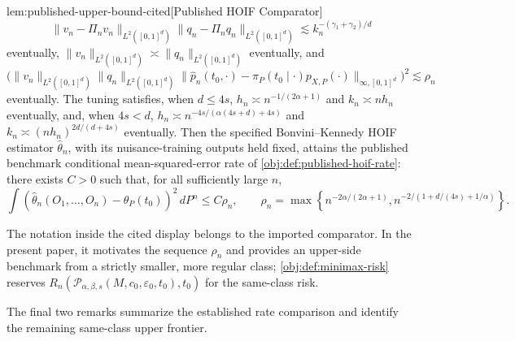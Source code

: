 \begin{citedv}{lem:published-upper-bound-cited}[Published HOIF Comparator]
\[
\|v_n-\Pi_n v_n\|_{L^2([0,1]^d)}
\|q_n-\Pi_n q_n\|_{L^2([0,1]^d)}
\lesssim k_n^{-(\gamma_1+\gamma_2)/d}
\]
eventually, \(\|v_n\|_{L^2([0,1]^d)}\asymp\|q_n\|_{L^2([0,1]^d)}\) eventually, and
\[
\bigl(\|v_n\|_{L^2([0,1]^d)}
\|q_n\|_{L^2([0,1]^d)}
\|\hat p_n(t_0,\cdot)-\pi_P(t_0\mid\cdot)p_{X,P}(\cdot)\|_{\infty,[0,1]^d}\bigr)^2
\lesssim \rho_n
\]
eventually. The tuning satisfies, when \(d\le 4s\), \(h_n\asymp n^{-1/(2\alpha+1)}\) and \(k_n\asymp nh_n\) eventually, and, when \(4s<d\), \(h_n\asymp n^{-4s/(\alpha(4s+d)+4s)}\) and \(k_n\asymp(nh_n)^{2d/(d+4s)}\) eventually. Then the specified Bonvini--Kennedy HOIF estimator \(\hat\theta_n\), with its nuisance-training outputs held fixed, attains the published benchmark conditional mean-squared-error rate of \cref{obj:def:published-hoif-rate}: there exists \(C>0\) such that, for all sufficiently large \(n\),
\[
\int (\hat\theta_n(O_1,\ldots,O_n)-\theta_P(t_0))^2\,dP^n
\le C\rho_n,\qquad
\rho_n=
\max\left\{n^{-2\alpha/(2\alpha+1)},
n^{-2/(1+d/(4s)+1/\alpha)}\right\}.
\]
\end{citedv}

The notation inside the cited display belongs to the imported comparator. In the present paper, it motivates the sequence \(\rho_n\) and provides an upper-side benchmark from a strictly smaller, more regular class; \cref{obj:def:minimax-risk} reserves \(R_n(\mathcal P_{\alpha,\beta,s}(M,c_0,\varepsilon_0,t_0),t_0)\) for the same-class risk.

The final two remarks summarize the established rate comparison and identify the remaining same-class upper frontier.

